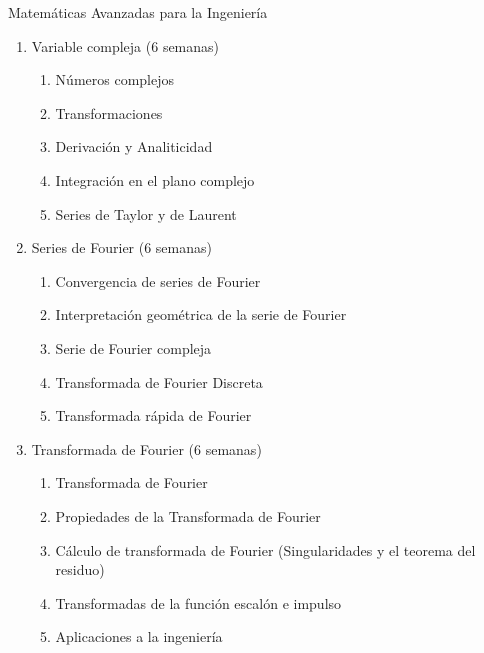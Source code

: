 \documentclass[12pt]{article}
\begin{document}
Matem\'aticas Avanzadas para la Ingenier\'ia
\begin{enumerate}
\item Variable compleja (6 semanas)
\begin{enumerate}
\item N\'umeros complejos
\item Transformaciones
\item Derivaci\'on y Analiticidad
\item Integraci\'on en el plano complejo
\item Series de Taylor y de Laurent
\end{enumerate}
\item Series de Fourier (6 semanas)
\begin{enumerate}
\item Convergencia de series de Fourier
\item Interpretaci\'on geom\'etrica de la serie de Fourier
\item Serie de Fourier compleja
\item Transformada de Fourier Discreta
\item Transformada r\'apida de Fourier
\end{enumerate}
\item Transformada de Fourier (6 semanas)
\begin{enumerate}
\item Transformada de Fourier
\item Propiedades de la Transformada de Fourier
\item C\'alculo de transformada de Fourier (Singularidades y el teorema del residuo)
\item Transformadas de la funci\'on escal\'on e impulso
\item Aplicaciones a la ingenier\'ia
\end{enumerate}

\end{enumerate}
\end{document}
